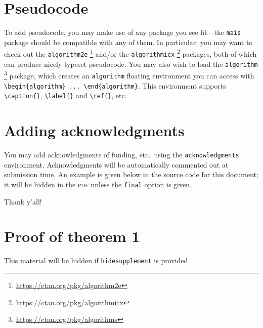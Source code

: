 \documentclass[11pt]{article}
\begin{document}
\section{Pseudocode}
\label{sec:code}

To add pseudocode, you may make use of any package you see fit---the \texttt{mais} package should be compatible with any of them. In particular, you may want to check out the \texttt{algorithm2e}%
%
\footnote{\url{https://ctan.org/pkg/algorithm2e}}
%
and/or the \texttt{algorithmicx}%
%
\footnote{\url{https://ctan.org/pkg/algorithmicx}}
%
packages, both of which can produce nicely typeset pseudocode. You may also wish
to load the \texttt{algorithm}%
%
\footnote{\url{https://ctan.org/pkg/algorithms}}
%
package, which creates an \texttt{algorithm} floating environment you can access
with \verb|\begin{algorithm} ... \end{algorithm}|. This environment supports
\verb|\caption{}|, \verb|\label{}| and \verb|\ref{}|, etc.

\section{Adding acknowledgments}

You may add acknowledgments of funding, etc.\ using the \texttt{acknowledgments} environment. Acknowledgments will be automatically commented out at submission time. An example is given below in the source code for this document; it will be hidden in the \textsc{pdf} unless the \texttt{final} option is given.

\begin{acknowledgements}
  Thank y'all!
\end{acknowledgements}







\appendix

\section{Proof of theorem 1}

This material will be hidden if \texttt{hidesupplement} is provided.
\end{document}
